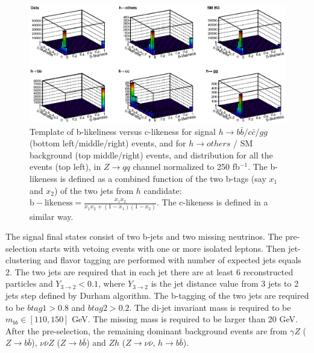 \begin{figure}[htb]
\begin{center}
\includegraphics[width=0.85\hsize]{chapters/figures/qqh_bbccgg_template_250.eps}
\end{center}
  \caption{Template of b-likeliness versus c-likeness for signal $h\to b\bar{b}/c\bar{c}/gg$
  (bottom left/middle/right) events,
and for $h\to others$ / SM background (top middle/right) events, and distribution for 
all the events (top left), in $Z\to qq$ channel normalized to 250 fb$^{-1}$. The b-likeness
is defined as a combined function of the two b-tags (say $x_1$ and $x_2$) 
of the two jets from $h$ candidate: $\mathrm{b-likeness} = \frac{x_1x_2}{x_1x_2+(1-x_1)(1-x_2)}$.
The c-likeness is defined in a similar way.}
  \label{fig:qqHbbccgg250}
\end{figure}

The signal final states consist of two b-jets and two missing neutrinos.
The pre-selection starts with vetoing events with one or more isolated 
leptons. Then jet-clustering and flavor tagging are performed with number of
expected jets equals 2. The two jets are required that in each jet there are at least 6
reconstructed particles and $Y_{3\to2}<0.1$, where $Y_{3\to 2}$ is the 
jet distance value from 3 jets to 2 jets step defined by Durham algorithm. The 
b-tagging of the two jets are required to be $btag1>0.8$ and $btag2>0.2$.
The di-jet invariant mass is required to be $m_{bb}\in[110,150]$ GeV.
The missing mass is required to be larger than 20 GeV.
After the pre-selection, the remaining dominant background events are
from $\gamma Z$ ($Z\to b\bar{b}$), $\nu\bar{\nu}Z$ ($Z\to b\bar{b}$) 
and $Zh$ ($Z\to\nu\bar{\nu}$, $h\to b\bar{b}$).

